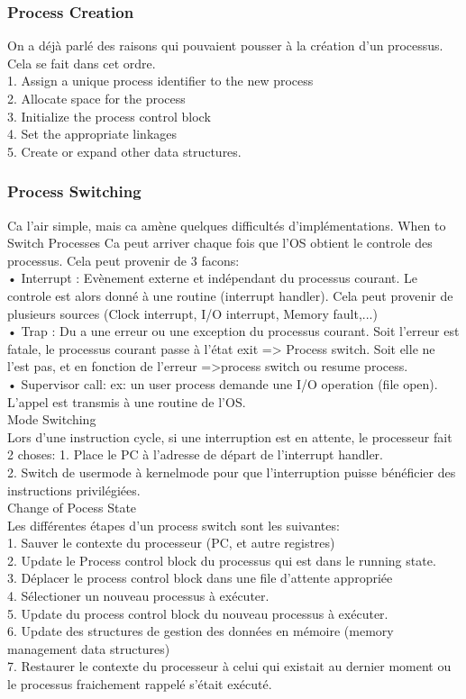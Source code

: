 \subsubsection{Process Creation}
On a déjà parlé des raisons qui pouvaient pousser à la création d'un processus. Cela se fait dans cet ordre. \\
1. Assign a unique process identifier to the new process \\
2. Allocate space for the process \\
3. Initialize the process control block \\
4. Set the appropriate linkages \\
5. Create or expand other data structures. \\
\subsubsection{Process Switching}
Ca l'air simple, mais ca amène quelques difficultés d'implémentations.
When to Switch Processes
Ca peut arriver chaque fois que l'OS obtient le controle des processus. Cela peut provenir de 3 facons: \\
• Interrupt : Evènement externe et indépendant du processus courant. Le controle est alors donné à une routine (interrupt handler). Cela peut provenir de plusieurs sources (Clock interrupt, I/O interrupt, Memory fault,...)  \\
• Trap : Du a une erreur ou une exception du processus courant. Soit l'erreur est fatale, le processus courant passe à l'état exit => Process switch. Soit elle ne l'est pas, et en fonction de l'erreur =>process switch ou resume process. \\
• Supervisor call: ex: un user process demande une I/O operation (file open). L'appel est transmis à une routine de l'OS. \\
Mode Switching \\
Lors d'une instruction cycle, si une interruption est en attente, le processeur fait 2 choses:
1. Place le PC à l'adresse de départ de l'interrupt handler. \\
2. Switch de usermode à kernelmode pour que l'interruption puisse bénéficier des instructions privilégiées. \\
Change of Pocess State \\
Les différentes étapes d'un process switch sont les suivantes: \\
1. Sauver le contexte du processeur (PC, et autre registres) \\
2. Update le Process control block du processus qui est dans le running state. \\
3. Déplacer le process control block dans une file d'attente appropriée \\
4. Sélectioner un nouveau processus à exécuter. \\
5. Update du process control block du nouveau processus à exécuter. \\
6. Update des structures de gestion des données en mémoire (memory management data structures) \\
7. Restaurer le contexte du processeur à celui qui existait au dernier moment ou le processus fraichement rappelé s'était exécuté.\\
